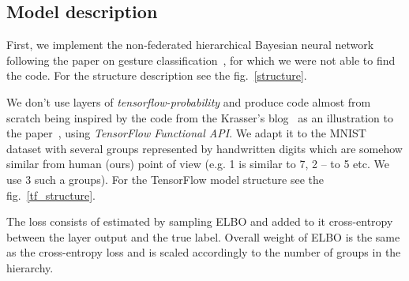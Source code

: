 \documentclass{article}
\begin{document}
\subsection*{Model description}


First, we implement the non-federated hierarchical Bayesian neural network following the paper on gesture classification~\cite{Gestures}, for which we were not able to find the code. For the structure description see the fig.~\ref{structure}.

We don't use layers of \textit{tensorflow-probability} and produce code almost from scratch being inspired by the code from the Krasser's blog~\cite{krasser_blog} as an illustration to the paper~\cite{blundell2015weight}, using \textit{TensorFlow Functional API}. We adapt it to the MNIST dataset with several groups represented by handwritten digits which are somehow similar from human (ours) point of view (e.g. 1 is similar to 7, 2 -- to 5 etc. We use 3 such a groups). For the TensorFlow model structure see the fig.~\ref{tf_structure}.

The loss consists of estimated by sampling ELBO and added to it cross-entropy between the layer output and the true label. Overall weight of ELBO is the same as the cross-entropy loss and is scaled accordingly to the number of groups in the hierarchy.
\end{document}
